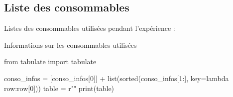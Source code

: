 \subsection{Liste des consommables}

Listes des consommables utilisées pendant l'expérience : 

\begin{table}[h]
\caption{Informations sur les consommables utilisées}
\begin{pycode}

from tabulate import tabulate

conso_infos = [conso_infos[0]] + list(sorted(conso_infos[1:], key=lambda row:row[0]))
table = r""
print(table)
\end{pycode}
\label{table-ensemencement}
\end{table}